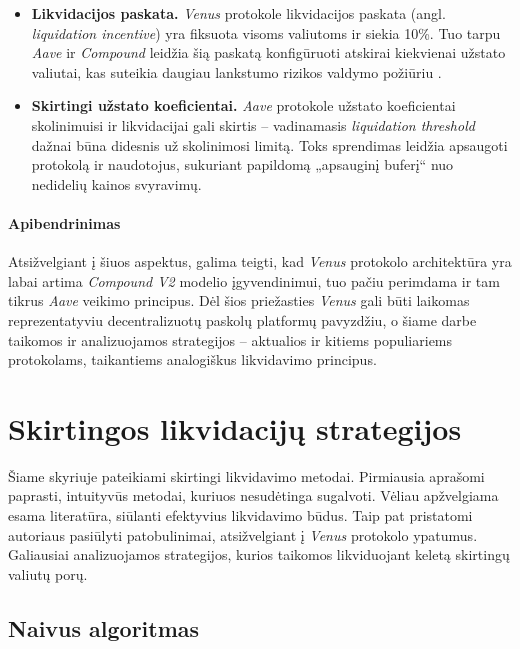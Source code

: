 \documentclass[]{VUMIFTemplateClass}
\begin{document}
\begin{itemize}
    \item \textbf{Likvidacijos paskata.} \textit{Venus} protokole likvidacijos paskata (angl. \textit{liquidation incentive}) yra fiksuota visoms valiutoms ir siekia 10\%. Tuo tarpu \textit{Aave} ir \textit{Compound} leidžia šią paskatą konfigūruoti atskirai kiekvienai užstato valiutai, kas suteikia daugiau lankstumo rizikos valdymo požiūriu \cite{compound-incentive, aave-liquidation}.

    \item \textbf{Skirtingi užstato koeficientai.} \textit{Aave} protokole užstato koeficientai skolinimuisi ir likvidacijai gali skirtis – vadinamasis \textit{liquidation threshold} dažnai būna didesnis už skolinimosi limitą. Toks sprendimas leidžia apsaugoti protokolą ir naudotojus, sukuriant papildomą „apsauginį buferį“ nuo nedidelių kainos svyravimų.
\end{itemize}

\paragraph{Apibendrinimas}

Atsižvelgiant į šiuos aspektus, galima teigti, kad \textit{Venus} protokolo architektūra yra labai artima \textit{Compound V2} modelio įgyvendinimui, tuo pačiu perimdama ir tam tikrus \textit{Aave} veikimo principus. Dėl šios priežasties \textit{Venus} gali būti laikomas reprezentatyviu decentralizuotų paskolų platformų pavyzdžiu, o šiame darbe taikomos ir analizuojamos strategijos – aktualios ir kitiems populiariems protokolams, taikantiems analogiškus likvidavimo principus.

\section{Skirtingos likvidacijų strategijos}
\label{sec:liq_strategijos}

Šiame skyriuje pateikiami skirtingi likvidavimo metodai. Pirmiausia aprašomi paprasti, intuityvūs metodai, kuriuos nesudėtinga sugalvoti. Vėliau apžvelgiama esama literatūra, siūlanti efektyvius likvidavimo būdus. Taip pat pristatomi autoriaus pasiūlyti patobulinimai, atsižvelgiant į \textit{Venus} protokolo ypatumus. Galiausiai analizuojamos strategijos, kurios taikomos likviduojant keletą skirtingų valiutų porų.

\subsection{Naivus algoritmas}
\label{sec:largest_borrow}
\end{document}
